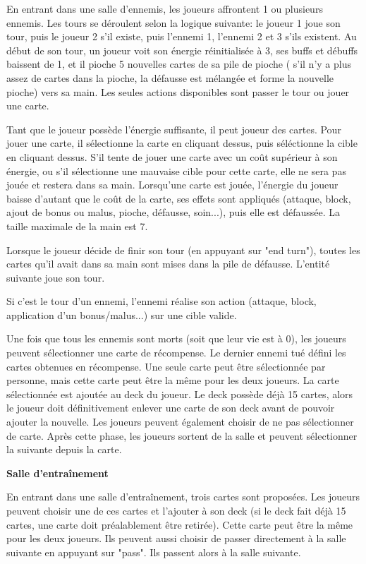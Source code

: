 En entrant dans une salle d'ennemis, les joueurs affrontent 1 ou plusieurs ennemis. Les tours se déroulent selon la logique suivante: le joueur 1 joue son tour, puis le joueur 2 s'il existe, puis l'ennemi 1, l'ennemi 2 et 3 s'ils existent. Au début de son tour, un joueur voit son énergie réinitialisée à 3, ses buffs et débuffs baissent de 1, et il pioche 5 nouvelles cartes de sa pile de pioche ( s'il n'y a plus assez de cartes dans la pioche, la défausse est mélangée et forme la nouvelle pioche) vers sa main. Les seules actions disponibles sont passer le tour ou jouer une carte. 
\par Tant que le joueur possède l'énergie suffisante, il peut joueur des cartes. Pour jouer une carte, il sélectionne la carte en cliquant dessus, puis séléctionne la cible en cliquant dessus. S'il tente de jouer une carte avec un coût supérieur à son énergie, ou s'il sélectionne une mauvaise cible pour cette carte, elle ne sera pas jouée et restera dans sa main. Lorsqu'une carte est jouée, l'énergie du joueur baisse d'autant que le coût de la carte, ses effets sont appliqués (attaque, block, ajout de bonus ou malus, pioche, défausse, soin...), puis elle est défaussée. La taille maximale de la main est 7.
\par Lorsque le joueur décide de finir son tour (en appuyant sur "end turn"), toutes les cartes qu'il avait dans sa main sont mises dans la pile de défausse. L'entité suivante joue son tour.
\par Si c'est le tour d'un ennemi, l'ennemi réalise son action (attaque, block, application d'un bonus/malus...) sur une cible valide.
\par Une fois que tous les ennemis sont morts (soit que leur vie est à 0), les joueurs peuvent sélectionner une carte de récompense. Le dernier ennemi tué défini les cartes obtenues en récompense. Une seule carte peut être sélectionnée par personne, mais cette carte peut être la même pour les deux joueurs. La carte sélectionnée est ajoutée au deck du joueur. Le deck possède déjà 15 cartes, alors le joueur doit définitivement enlever une carte de son deck avant de pouvoir ajouter la nouvelle. Les joueurs peuvent également choisir de ne pas sélectionner de carte. Après cette phase, les joueurs sortent de la salle et peuvent sélectionner la suivante depuis la carte.

\textbf{Salle d'entraînement}

En entrant dans une salle d'entraînement, trois cartes sont proposées. Les joueurs peuvent choisir une de ces cartes et l'ajouter à son deck (si le deck fait déjà 15 cartes, une carte doit préalablement être retirée). Cette carte peut être la même pour les deux joueurs. Ils peuvent aussi choisir de passer directement à la salle suivante en appuyant sur "pass". Ils passent alors à la salle suivante.

